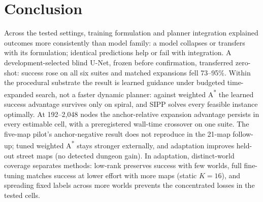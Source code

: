 \documentclass[letterpaper]{article} %
\begin{document}
\section{Conclusion}

 Across the tested settings, training formulation and planner integration explained outcomes more consistently than model family: a model collapses or transfers with its formulation; identical predictions help or fail with integration. A development-selected blind U-Net, frozen before confirmation, transferred zero-shot: success rose on all six suites and matched expansions fell 73--95\%. Within the procedural substrate the result is learned guidance under budgeted time-expanded search, not a faster dynamic planner: against weighted A\textsuperscript{*} the learned success advantage survives only on spiral, and SIPP solves every feasible instance optimally. At 192--2{,}048 nodes the anchor-relative expansion advantage persists in every estimable cell, with a preregistered wall-time crossover on one suite. The five-map pilot's anchor-negative result does not reproduce in the 21-map follow-up; tuned weighted A\textsuperscript{*} stays stronger externally, and adaptation improves held-out street maps (no detected dungeon gain). In adaptation, distinct-world coverage separates methods: low-rank preserves success with few worlds, full fine-tuning matches success at lower effort with more maps (static $K{=}16$), and spreading fixed labels across more worlds prevents the concentrated losses in the tested cells.

\clearpage


\end{document}
